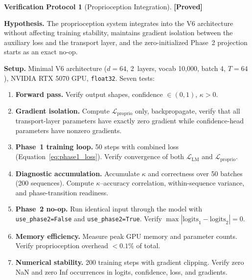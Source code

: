 \documentclass[11pt,a4paper]{article}
\theoremstyle{definition}
\newtheorem{protocol}[theorem]{Verification Protocol}
\theoremstyle{remark}
\newcommand{\statusproved}{\textcolor{green!50!black}{\textbf{[Proved]}}}
\begin{document}
\begin{protocol}[Proprioception Integration]
\label{prot:proprioception}
\statusproved

\textbf{Hypothesis.} The proprioception system integrates 
into the V6 architecture without affecting training stability, 
maintains gradient isolation between the auxiliary loss and the 
transport layer, and the zero-initialized Phase~2 projection 
starts as an exact no-op.

\textbf{Setup.} Minimal V6 architecture ($d = 64$, 2~layers, 
vocab 10{,}000, batch 4, $T = 64$), NVIDIA RTX 5070 GPU, 
\texttt{float32}. Seven tests:
\begin{enumerate}[nosep,label=T\arabic*.]
    \item \textbf{Forward pass.} Verify output shapes, confidence 
    $\in (0,1)$, $\kappa > 0$.
    \item \textbf{Gradient isolation.} Compute 
    $\mathcal{L}_{\mathrm{proprio}}$ only, backpropagate, verify 
    that all transport-layer parameters have exactly zero gradient 
    while confidence-head parameters have nonzero gradients.
    \item \textbf{Phase~1 training loop.} 50 steps with combined 
    loss (Equation~\ref{eq:phase1_loss}). Verify convergence of 
    both $\mathcal{L}_{\mathrm{LM}}$ and 
    $\mathcal{L}_{\mathrm{proprio}}$.
    \item \textbf{Diagnostic accumulation.} Accumulate $\kappa$ and 
    correctness over 50 batches (200 sequences). Compute 
    $\kappa$--accuracy correlation, within-sequence variance, and 
    phase-transition readiness.
    \item \textbf{Phase~2 no-op.} Run identical input through the 
    model with \texttt{use\_phase2=False} and 
    \texttt{use\_phase2=True}. Verify $\max|
    \mathrm{logits}_1 - \mathrm{logits}_2| = 0$.
    \item \textbf{Memory efficiency.} Measure peak GPU memory and 
    parameter counts. Verify proprioception overhead $< 0.1\%$ 
    of total.
    \item \textbf{Numerical stability.} 200 training steps with 
    gradient clipping. Verify zero NaN and zero Inf occurrences 
    in logits, confidence, loss, and gradients.
\end{enumerate}


\end{protocol}
\end{document}
